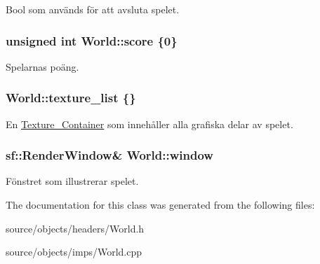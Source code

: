 Bool som används för att avsluta spelet. 

\hypertarget{classWorld_a8e0d399d947596356b65e8bcb5d4cad8}{
\subsubsection[{score}]{\setlength{\rightskip}{0pt plus 5cm}unsigned int World\+::score \{0\}\hspace{0.3cm}{\ttfamily [private]}}}\label{classWorld_a8e0d399d947596356b65e8bcb5d4cad8}


Spelarnas poäng. 

\hypertarget{classWorld_a77cc00620c137bb0b8b2620912b4dddc}{
\subsubsection[{texture\+\_\+list}]{ World\+::texture\+\_\+list \{\}\hspace{0.3cm}{\ttfamily [private]}}}\label{classWorld_a77cc00620c137bb0b8b2620912b4dddc}


En \hyperlink{classTexture__Container}{Texture\+\_\+\+Container} som innehåller alla grafiska delar av spelet. 

\hypertarget{classWorld_a81c4b706c899cd5cf8598ed79a691934}{
\subsubsection[{window}]{\setlength{\rightskip}{0pt plus 5cm}sf\+::\+Render\+Window\& World\+::window\hspace{0.3cm}{\ttfamily [private]}}}\label{classWorld_a81c4b706c899cd5cf8598ed79a691934}


Fönstret som illustrerar spelet. 



The documentation for this class was generated from the following files\+:\begin{DoxyCompactItemize}
\item 
source/objects/headers/World.\+h\item 
source/objects/imps/World.\+cpp\end{DoxyCompactItemize}
